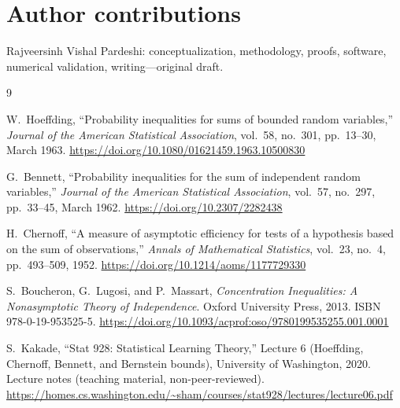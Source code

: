 \documentclass[11pt]{article}
\begin{document}
\section*{Author contributions}
Rajveersinh Vishal Pardeshi: conceptualization, methodology, proofs, software, numerical validation, writing---original draft.

\begin{thebibliography}{9}

W.~Hoeffding,
``Probability inequalities for sums of bounded random variables,''
\emph{Journal of the American Statistical Association}, vol.~58, no.~301,
pp.~13--30, March 1963.
\url{https://doi.org/10.1080/01621459.1963.10500830}

G.~Bennett,
``Probability inequalities for the sum of independent random variables,''
\emph{Journal of the American Statistical Association}, vol.~57, no.~297,
pp.~33--45, March 1962.
\url{https://doi.org/10.2307/2282438}

H.~Chernoff,
``A measure of asymptotic efficiency for tests of a hypothesis based on the sum of observations,''
\emph{Annals of Mathematical Statistics}, vol.~23, no.~4,
pp.~493--509, 1952.
\url{https://doi.org/10.1214/aoms/1177729330}

S.~Boucheron, G.~Lugosi, and P.~Massart,
\emph{Concentration Inequalities: A Nonasymptotic Theory of Independence}.
Oxford University Press, 2013.
ISBN 978-0-19-953525-5.
\url{https://doi.org/10.1093/acprof:oso/9780199535255.001.0001}

S.~Kakade,
``Stat 928: Statistical Learning Theory,'' Lecture 6 (Hoeffding, Chernoff,
Bennett, and Bernstein bounds), University of Washington, 2020.
Lecture notes (teaching material, non-peer-reviewed).
\url{https://homes.cs.washington.edu/~sham/courses/stat928/lectures/lecture06.pdf}

\end{thebibliography}
\end{document}
